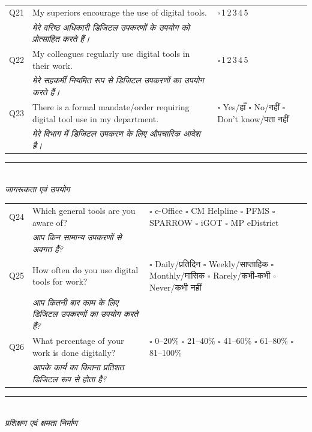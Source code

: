 \documentclass[10pt,a4paper]{article}
\newcommand{\likert}{{\Large$\square$}\,1\quad{\Large$\square$}\,2\quad{\Large$\square$}\,3\quad{\Large$\square$}\,4\quad{\Large$\square$}\,5}
\begin{document}
\noindent\begin{tabularx}{\textwidth}{@{}L{0.8cm} X L{5.2cm}@{}}
Q21 & My superiors encourage the use of digital tools. & \likert \\
 & {\hindifont\small\itshape\color{black!70} मेरे वरिष्ठ अधिकारी डिजिटल उपकरणों के उपयोग को प्रोत्साहित करते हैं।} & \\[3pt]
Q22 & My colleagues regularly use digital tools in their work. & \likert \\
 & {\hindifont\small\itshape\color{black!70} मेरे सहकर्मी नियमित रूप से डिजिटल उपकरणों का उपयोग करते हैं।} & \\[3pt]
Q23 & There is a formal mandate/order requiring digital tool use in my department. & {\Large$\square$} Yes/{\hindifont हाँ} {\Large$\square$} No/{\hindifont नहीं} {\Large$\square$} Don't know/{\hindifont पता नहीं} \\
 & {\hindifont\small\itshape\color{black!70} मेरे विभाग में डिजिटल उपकरण के लिए औपचारिक आदेश है।} & \\[3pt]
\end{tabularx}
\vspace{4pt}
\noindent\rule{\textwidth}{0.3pt}\vspace{3pt}
\\
{\hindifont\itshape\color{black!70} जागरूकता एवं उपयोग}\vspace{3pt}

\noindent\begin{tabularx}{\textwidth}{@{}L{0.8cm} X L{5.2cm}@{}}
Q24 & Which general tools are you aware of? & {\Large$\square$} e-Office {\Large$\square$} CM Helpline {\Large$\square$} PFMS {\Large$\square$} SPARROW {\Large$\square$} iGOT {\Large$\square$} MP eDistrict \\
 & {\hindifont\small\itshape\color{black!70} आप किन सामान्य उपकरणों से अवगत हैं?} & \\[3pt]
Q25 & How often do you use digital tools for work? & {\Large$\square$} Daily/{\hindifont प्रतिदिन} {\Large$\square$} Weekly/{\hindifont साप्ताहिक} {\Large$\square$} Monthly/{\hindifont मासिक} {\Large$\square$} Rarely/{\hindifont कभी-कभी} {\Large$\square$} Never/{\hindifont कभी नहीं} \\
 & {\hindifont\small\itshape\color{black!70} आप कितनी बार काम के लिए डिजिटल उपकरणों का उपयोग करते हैं?} & \\[3pt]
Q26 & What percentage of your work is done digitally? & {\Large$\square$} 0--20\% {\Large$\square$} 21--40\% {\Large$\square$} 41--60\% {\Large$\square$} 61--80\% {\Large$\square$} 81--100\% \\
 & {\hindifont\small\itshape\color{black!70} आपके कार्य का कितना प्रतिशत डिजिटल रूप से होता है?} & \\[3pt]
\end{tabularx}
\newpage
\noindent\rule{\textwidth}{0.3pt}\vspace{3pt}
\\
{\hindifont\itshape\color{black!70} प्रशिक्षण एवं क्षमता निर्माण}\vspace{3pt}
\end{document}
